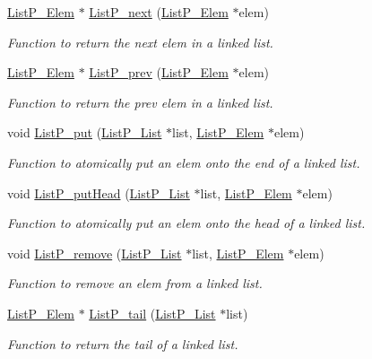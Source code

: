 \begin{DoxyCompactItemize}
\hyperlink{struct_list_p___elem}{List\+P\+\_\+\+Elem} $\ast$ \hyperlink{_list_p_8h_a3f00e523ca1c68910094ffb88c034b64}{List\+P\+\_\+next} (\hyperlink{struct_list_p___elem}{List\+P\+\_\+\+Elem} $\ast$elem)
\begin{DoxyCompactList}\small\item\em Function to return the next elem in a linked list. \end{DoxyCompactList}\item 
\hyperlink{struct_list_p___elem}{List\+P\+\_\+\+Elem} $\ast$ \hyperlink{_list_p_8h_a76c97dd1c7c078919e9cc0d72722e2ef}{List\+P\+\_\+prev} (\hyperlink{struct_list_p___elem}{List\+P\+\_\+\+Elem} $\ast$elem)
\begin{DoxyCompactList}\small\item\em Function to return the prev elem in a linked list. \end{DoxyCompactList}\item 
void \hyperlink{_list_p_8h_a0a7f250522308dd73892117dd6528d3b}{List\+P\+\_\+put} (\hyperlink{struct_list_p___list}{List\+P\+\_\+\+List} $\ast$list, \hyperlink{struct_list_p___elem}{List\+P\+\_\+\+Elem} $\ast$elem)
\begin{DoxyCompactList}\small\item\em Function to atomically put an elem onto the end of a linked list. \end{DoxyCompactList}\item 
void \hyperlink{_list_p_8h_a1f55484fc6fc6e5ab515e6652fde61bf}{List\+P\+\_\+put\+Head} (\hyperlink{struct_list_p___list}{List\+P\+\_\+\+List} $\ast$list, \hyperlink{struct_list_p___elem}{List\+P\+\_\+\+Elem} $\ast$elem)
\begin{DoxyCompactList}\small\item\em Function to atomically put an elem onto the head of a linked list. \end{DoxyCompactList}\item 
void \hyperlink{_list_p_8h_a283e072509d6d31430afbb36c3b2ae55}{List\+P\+\_\+remove} (\hyperlink{struct_list_p___list}{List\+P\+\_\+\+List} $\ast$list, \hyperlink{struct_list_p___elem}{List\+P\+\_\+\+Elem} $\ast$elem)
\begin{DoxyCompactList}\small\item\em Function to remove an elem from a linked list. \end{DoxyCompactList}\item 
\hyperlink{struct_list_p___elem}{List\+P\+\_\+\+Elem} $\ast$ \hyperlink{_list_p_8h_ab760fa05837473cb5a2a08d5d15cca88}{List\+P\+\_\+tail} (\hyperlink{struct_list_p___list}{List\+P\+\_\+\+List} $\ast$list)
\begin{DoxyCompactList}\small\item\em Function to return the tail of a linked list. \end{DoxyCompactList}\end{DoxyCompactItemize}


